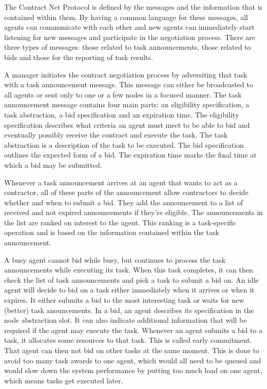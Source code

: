 \documentclass[10pt,a4paper]{article}
\begin{document}
The Contract Net Protocol is defined by the messages and the information that is contained within them. By having a common language for these messages, all agents can communicate with each other and new agents can immediately start listening for new messages and participate in the negotiation process. There are three types of messages: those related to task announcements, those related to bids and those for the reporting of task results.

A manager initiates the contract negotiation process by adversiting that task with a task announcement message. This message can either be broadcasted to all agents or sent only to one or a few nodes in a focused manner. The task announcement message contains four main parts: an eligibility specification, a task abstraction, a bid specification and an expiration time. The eligibility specification describes what criteria an agent must meet to be able to bid and eventually possibly receive the contract and execute the task. The task abstraction is a description of the task to be executed. The bid specification outlines the expected form of a bid. The expiration time marks the final time at which a bid may be submitted.

Whenever a task announcement arrives at an agent that wants to act as a contractor, all of these parts of the announcement allow contractors to decide whether and when to submit a bid. They add the announcement to a list of received and not expired announcements if they're eligible. The announcements in the list are ranked on interest to the agent. This ranking is a task-specific operation and is based on the information contained within the task announcement.

A busy agent cannot bid while busy, but continues to process the task announcements while executing its task. When this task completes, it can then check the list of task announcements and pick a task to submit a bid on. An idle agent will decide to bid on a task either immediately when it arrives or when it expires. It either submits a bid to the most interesting task or waits for new (better) task anouncements. In a bid, an agent describes its specification in the node abstraction slot. It can also indicate additional information that will be required if the agent may execute the task. Whenever an agent submits a bid to a task, it allocates some resources to that task. This is called early commitment. That agent can then not bid on other tasks at the same moment. This is done to avoid too many task awards to one agent, which would all need to be queued and would slow down the system performance by putting too much load on one agent, which means tasks get executed later.
\end{document}
